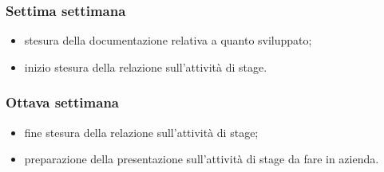 {    \subsubsection{Settima settimana} 
    \begin{itemize}
        \item stesura della documentazione relativa a quanto sviluppato;
        \item inizio stesura della relazione sull'attività di stage.
    \end{itemize}

    \subsubsection{Ottava settimana} 
    \begin{itemize}
        \item fine stesura della relazione sull'attività di stage;
        \item preparazione della presentazione sull'attività di stage da fare in azienda.
    \end{itemize}
}

\newcommand{\totaleOre}{300}

\newcommand{\obiettiviObbligatori}{
	 \item \textbf{RO-1:} acquisizione delle competenze sulle tematiche relative alla blockchain e alle tecnologie associate;
	 \item \textbf{RO-2:} implementazione di un \textit{proof of concept} che permetta l'interazione con la blockchain di Commerc.io per il riconoscimento delle identità digitali e la trasmissione di documenti, tramite un'interfaccia grafica basilare;
	 \item \textbf{RO-3:} stesura della documentazione relativa ai risultati ottenuti nel corso delle varie fasi del progetto e alla gestione delle difficoltà incontrate;
	 \item \textbf{RO-4:} stesura della relazione riguardante il lavoro svolto durante tutto il periodo di stage.
}

\newcommand{\obiettiviDesiderabili}{
	 \item \textbf{RD-1:} implementazione di un'interfaccia web completa per il \textit{proof of concept}.
}

\newcommand{\obiettiviFacoltativi}{
	 \item \textbf{RF-1:} sviluppo di un'applicazione mobile in Flutter che offra le funzionalità richieste per il \textit{proof of concept}.
}
